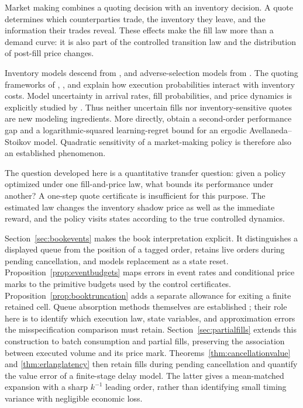 \documentclass[11pt]{article}
\theoremstyle{plain}
\theoremstyle{definition}
\theoremstyle{remark}
\begin{document}
Market making combines a quoting decision with an inventory decision.
A quote determines which counterparties trade, the inventory they leave,
and the information their trades reveal. These effects make the fill law
more than a demand curve: it is also part of the controlled transition
law and the distribution of post-fill price changes.

Inventory models descend from \citet{HoStoll1981}, and adverse-selection
models from \citet{GlostenMilgrom1985}. The quoting frameworks of
\citet{AvellanedaStoikov2008}, \citet{GueantLehalleFernandezTapia2013},
and \citet{CarteaJaimungalPenalva2015} explain how execution probabilities
interact with inventory costs. Model uncertainty in arrival rates, fill
probabilities, and price dynamics is explicitly studied by
\citet{CarteaDonnellyJaimungal2017}. Thus neither uncertain fills nor
inventory-sensitive quotes are new modeling ingredients.
More directly, \citet{CaoEtAl2026} obtain a second-order performance gap
and a logarithmic-squared learning-regret bound for an ergodic
Avellaneda--Stoikov model. Quadratic sensitivity of a market-making
policy is therefore also an established phenomenon.

The question developed here is a quantitative transfer question:
given a policy optimized under one fill-and-price law, what bounds its
performance under another? A one-step quote certificate is insufficient
for this purpose. The estimated law changes the inventory shadow price
as well as the immediate reward, and the policy visits states according
to the true controlled dynamics.

Section~\ref{sec:bookevents} makes the book interpretation explicit.
It distinguishes a displayed queue from the position of a tagged order,
retains live orders during pending cancellation, and models replacement
as a state reset. Proposition~\ref{prop:eventbudgets} maps errors in
event rates and conditional price marks to the primitive budgets used
by the control certificates. Proposition~\ref{prop:booktruncation}
adds a separate allowance for exiting a finite retained cell. Queue
absorption methods themselves are established
\citep{ContStoikovTalreja2010}; their role here is to identify which
execution law, state variables, and approximation errors the
misspecification comparison must retain.
Section~\ref{sec:partialfills} extends this construction to
batch consumption and partial fills, preserving the association
between executed volume and its price mark.
Theorems~\ref{thm:cancellationvalue} and \ref{thm:erlanglatency}
then retain fills during pending cancellation and quantify the
value error of a finite-stage delay model. The latter gives a
mean-matched expansion with a sharp \(k^{-1}\) leading order,
rather than identifying small timing variance with negligible
economic loss.
\end{document}
